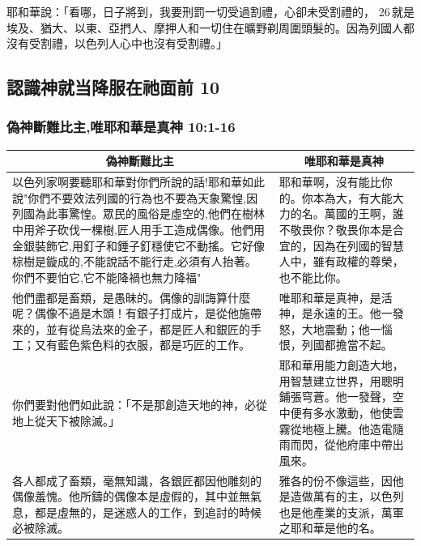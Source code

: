 耶和華說：「看哪，日子將到，我要刑罰一切受過割禮，心卻未受割禮的， 26 就是埃及、猶大、以東、亞捫人、摩押人和一切住在曠野剃周圍頭髮的。因為列國人都沒有受割禮，以色列人心中也沒有受割禮。」




\subsection{認識神就当降服在祂面前 10}
\subsubsection{偽神斷難比主,唯耶和華是真神 10:1-16}
\begin{table}[H]
\centering
\begin{tabular}{p{10.8cm}|p{6.50cm}}\hline\hline
\multicolumn{1}{c|}{偽神斷難比主}&\multicolumn{1}{c}{唯耶和華是真神}\\\hline
以色列家啊要聽耶和華對你們所說的話!耶和華如此說"你們不要效法列國的行為也不要為天象驚惶,因列國為此事驚惶。眾民的風俗是虛空的,他們在樹林中用斧子砍伐一棵樹,匠人用手工造成偶像。他們用金銀裝飾它,用釘子和錘子釘穩使它不動搖。它好像棕樹是鏇成的,不能說話不能行走,必須有人抬著。你們不要怕它,它不能降禍也無力降福"
&耶和華啊，沒有能比你的。你本為大，有大能大力的名。萬國的王啊，誰不敬畏你？敬畏你本是合宜的，因為在列國的智慧人中，雖有政權的尊榮，也不能比你。\\\hline
他們盡都是畜類，是愚昧的。偶像的訓誨算什麼呢？偶像不過是木頭！有銀子打成片，是從他施帶來的，並有從烏法來的金子，都是匠人和銀匠的手工；又有藍色紫色料的衣服，都是巧匠的工作。 
&唯耶和華是真神，是活神，是永遠的王。他一發怒，大地震動；他一惱恨，列國都擔當不起。\\\hline
你們要對他們如此說：「不是那創造天地的神，必從地上從天下被除滅。」
&耶和華用能力創造大地，用智慧建立世界，用聰明鋪張穹蒼。他一發聲，空中便有多水激動，他使雲霧從地極上騰。他造電隨雨而閃，從他府庫中帶出風來。\\\hline
各人都成了畜類，毫無知識，各銀匠都因他雕刻的偶像羞愧。他所鑄的偶像本是虛假的，其中並無氣息，都是虛無的，是迷惑人的工作，到追討的時候必被除滅。&雅各的份不像這些，因他是造做萬有的主，以色列也是他產業的支派，萬軍之耶和華是他的名。\\\hline
\end{tabular}
\end{table}


